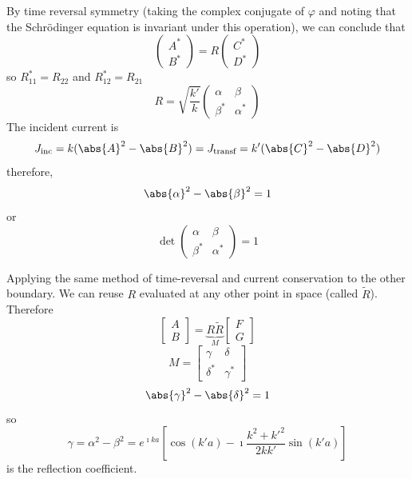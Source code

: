 \documentclass[a4paper,twoside,master.tex]{subfiles}
\begin{document}
By time reversal symmetry (taking the complex conjugate of $ \varphi $ and noting that the Schr\"odinger equation is invariant under this operation), we can conclude that
\begin{equation}
    \begin{pmatrix}A^*\\B^*\end{pmatrix} = R\begin{pmatrix}C^*\\D^*\end{pmatrix}
\end{equation}
so $ R^*_{11} = R_{22} $ and $ R^*_{12} = R_{21} $
\begin{equation}
    R = \sqrt{\frac{k'}{k}} \begin{pmatrix} \alpha & \beta\\\beta^* & \alpha^*\end{pmatrix}
\end{equation}
The incident current is
\begin{equation}
    J_{\text{inc}} = k(\abs{A}^2 - \abs{B}^2) = J_{\text{transf}} = k'(\abs{C}^2 - \abs{D}^2)
\end{equation}
therefore,
\begin{equation}
    \abs{\alpha}^2 - \abs{\beta}^2 = 1
\end{equation}
or
\begin{equation}
    \det{\begin{pmatrix} \alpha & \beta\\\beta^* & \alpha^*\end{pmatrix}} = 1
\end{equation}

Applying the same method of time-reversal and current conservation to the other boundary. We can reuse $ R $ evaluated at any other point in space (called $ \tilde{R} $). Therefore
\begin{equation}
    \begin{bmatrix}
        A\\B
    \end{bmatrix}
    =\underbrace{R\tilde{R}}_{M} 
    \begin{bmatrix}
        F\\G
    \end{bmatrix}
\end{equation}
\begin{equation}
    M=
    \begin{bmatrix}
        \gamma & \delta \\ \delta^* & \gamma^*
    \end{bmatrix}
\end{equation}
\begin{equation}
    \abs{\gamma}^2 - \abs{\delta}^2 = 1
\end{equation}
so
\begin{equation}
    \gamma = \alpha^2 - \beta^2 = e^{\imath ka} \left[ \cos(k'a) -\imath \frac{k^2 + k'^2}{2kk'} \sin(k'a) \right]
\end{equation}
is the reflection coefficient.
\end{document}
